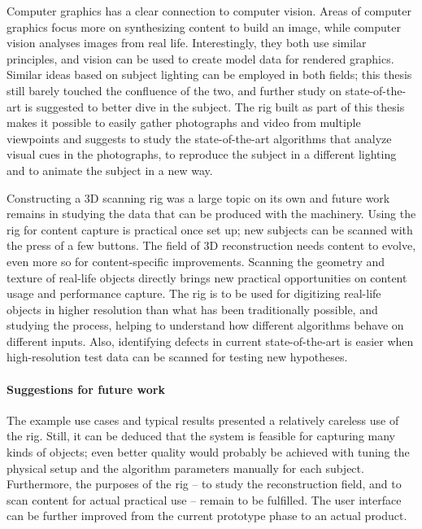 Computer graphics has a clear connection to computer vision.
Areas of computer graphics focus more on synthesizing content to build an image, while computer vision analyses images from real life.
Interestingly, they both use similar principles, and vision can be used to create model data for rendered graphics.
Similar ideas based on subject lighting can be employed in both fields; this thesis still barely touched the confluence of the two, and further study on state-of-the-art is suggested to better dive in the subject.
The rig built as part of this thesis makes it possible to easily gather photographs and video from multiple viewpoints and suggests to study the state-of-the-art algorithms that analyze visual cues in the photographs, to reproduce the subject in a different lighting and to animate the subject in a new way.

Constructing a 3D scanning rig was a large topic on its own and future work remains in studying the data that can be produced with the machinery.
Using the rig for content capture is practical once set up; new subjects can be scanned with the press of a few buttons.
The field of 3D reconstruction needs content to evolve, even more so for content-specific improvements.
Scanning the geometry and texture of real-life objects directly brings new practical opportunities on content usage and performance capture.
The rig is to be used for digitizing real-life objects in higher resolution than what has been traditionally possible, and studying the process, helping to understand how different algorithms behave on different inputs.
Also, identifying defects in current state-of-the-art is easier when high-resolution test data can be scanned for testing new hypotheses.


\paragraph{Suggestions for future work}
The example use cases and typical results presented a relatively careless use of the rig.
Still, it can be deduced that the system is feasible for capturing many kinds of objects; even better quality would probably be achieved with tuning the physical setup and the algorithm parameters manually for each subject.
Furthermore, the purposes of the rig -- to study the reconstruction field, and to scan content for actual practical use -- remain to be fulfilled.
The user interface can be further improved from the current prototype phase to an actual product.

